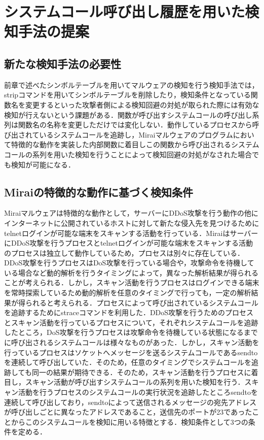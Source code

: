 \chapter{システムコール呼び出し履歴を用いた検知手法の提案}

\section{新たな検知手法の必要性}
前章で述べたシンボルテーブルを用いてマルウェアの検知を行う検知手法では，stripコマンドを用いてシンボルテーブルを削除したり，検知条件となっている関数名を変更するといった攻撃者側による検知回避の対処が取られた際には有効な検知が行えないという課題がある．関数が呼び出すシステムコールの呼び出し系列は関数名の名称を変更しただけでは変化しない．動作しているプロセスから呼び出されているシステムコールを追跡し，Miraiマルウェアのプログラムにおいて特徴的な動作を実装した内部関数に着目しこの関数から呼び出されるシステムコールの系列を用いた検知を行うことによって検知回避の対処がなされた場合でも検知が可能になる．


\section{Miraiの特徴的な動作に基づく検知条件}
Miraiマルウェアは特徴的な動作として，サーバーにDDoS攻撃を行う動作の他にインターネットに公開されているホストに対して新たな侵入先を見つけるためにtelnetログインが可能な端末をスキャンする活動を行っている．MiraiはサーバーにDDoS攻撃を行うプロセスとtelnetログインが可能な端末をスキャンする活動のプロセスは独立して動作しているため，プロセスは別々に存在している．DDoS攻撃を行うプロセスはDoS攻撃を行っている場合や，攻撃命令を待機している場合など動的解析を行うタイミングによって，異なった解析結果が得られることが考えられる．しかし，スキャン活動を行うプロセスはログインできる端末を常時探索しているため動的解析を任意のタイミングで行っても，一定の解析結果が得られると考えられる．プロセスによって呼び出されているシステムコールを追跡するためにstraceコマンドを利用した．DDoS攻撃を行うためのプロセスとスキャン活動を行っているプロセスについて，それぞれシステムコールを追跡したところ，DoS攻撃を行うプロセスは攻撃命令を待機している状態になるまでに呼び出されるシステムコールは様々なものがあった．しかし，スキャン活動を行っているプロセスはソケットへメッセージを送るシステムコールであるsendtoを連続して呼び出していた．そのため，任意のタイミングでシステムコールを追跡しても同一の結果が期待できる．そのため，スキャン活動を行うプロセスに着目し，スキャン活動が呼び出すシステムコールの系列を用いた検知を行う．スキャン活動を行うプロセスのシステムコールの実行状況を追跡したところsendtoを連続して呼び出しており，sendtoによって送信されるメッセージの宛先アドレスが呼び出しごとに異なったアドレスであること，送信先のポートが23であったことからこのシステムコールを検知に用いる特徴とする．検知条件として3つの条件を定める．


